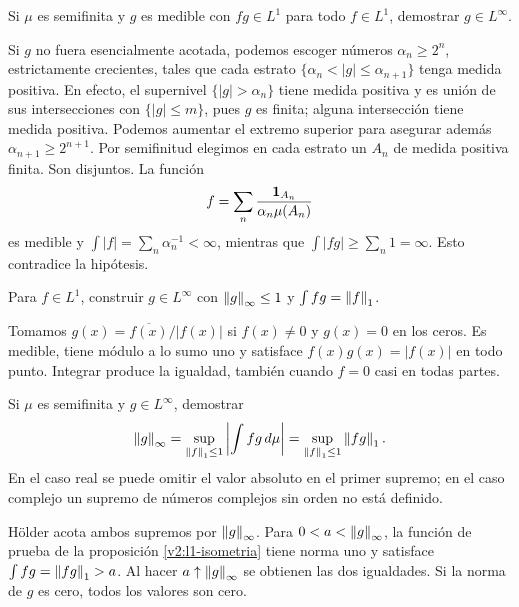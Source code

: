 \begin{ejercicio}\label{ej:v2-l23-1}
Si $\mu$ es semifinita y $g$ es medible con $fg\in L^1$ para todo $f\in L^1$, demostrar $g\in L^\infty$.
\end{ejercicio}
\begin{solucion}
Si $g$ no fuera esencialmente acotada, podemos escoger números $\alpha_n\ge2^n$, estrictamente crecientes, tales que cada estrato $\{\alpha_n<|g|\le\alpha_{n+1}\}$ tenga medida positiva. En efecto, el supernivel $\{|g|>\alpha_n\}$ tiene medida positiva y es unión de sus intersecciones con $\{|g|\le m\}$, pues $g$ es finita; alguna intersección tiene medida positiva. Podemos aumentar el extremo superior para asegurar además $\alpha_{n+1}\ge2^{n+1}$. Por semifinitud elegimos en cada estrato un $A_n$ de medida positiva finita. Son disjuntos. La función
\[
 f=\sum_n\frac{\mathbf1_{A_n}}{\alpha_n\mu(A_n)}
\]
es medible y $\int|f|=\sum_n\alpha_n^{-1}<\infty$, mientras que $\int|fg|\ge\sum_n1=\infty$. Esto contradice la hipótesis.
\end{solucion}

\begin{ejercicio}\label{ej:v2-l23-2}
Para $f\in L^1$, construir $g\in L^\infty$ con $\left\lVert g\right\rVert_\infty\le1$ y $\int fg=\left\lVert f\right\rVert_1$.
\end{ejercicio}
\begin{solucion}
Tomamos $g(x)=\overline{f(x)}/|f(x)|$ si $f(x)\ne0$ y $g(x)=0$ en los ceros. Es medible, tiene módulo a lo sumo uno y satisface $f(x)g(x)=|f(x)|$ en todo punto. Integrar produce la igualdad, también cuando $f=0$ casi en todas partes.
\end{solucion}

\begin{ejercicio}\label{ej:v2-l23-3}
Si $\mu$ es semifinita y $g\in L^\infty$, demostrar
\[
 \left\lVert g\right\rVert_\infty=\sup_{\left\lVert f\right\rVert_1\le1}\left|\int fg\,d\mu\right|
 =\sup_{\left\lVert f\right\rVert_1\le1}\left\lVert fg\right\rVert_1.
\]
En el caso real se puede omitir el valor absoluto en el primer supremo; en el caso complejo un supremo de números complejos sin orden no está definido.
\end{ejercicio}
\begin{solucion}
Hölder acota ambos supremos por $\left\lVert g\right\rVert_\infty$. Para $0<a<\left\lVert g\right\rVert_\infty$, la función de prueba de la proposición \ref{v2:l1-isometria} tiene norma uno y satisface $\int fg=\left\lVert fg\right\rVert_1>a$. Al hacer $a\uparrow\left\lVert g\right\rVert_\infty$ se obtienen las dos igualdades. Si la norma de $g$ es cero, todos los valores son cero.
\end{solucion}

